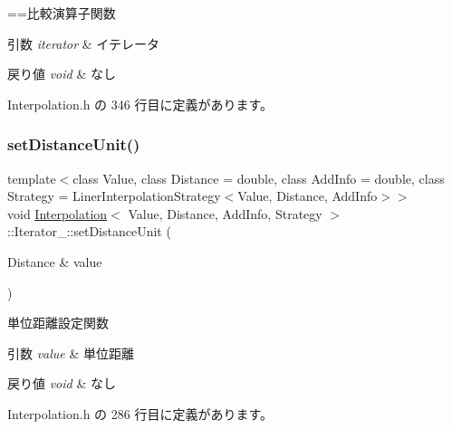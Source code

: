 ==比較演算子関数 


\begin{DoxyParams}{引数}
{\em iterator} & イテレータ \\
\hline
\end{DoxyParams}

\begin{DoxyRetVals}{戻り値}
{\em void} & なし \\
\hline
\end{DoxyRetVals}


 Interpolation.\+h の 346 行目に定義があります。

\mbox{\label{class_interpolation_1_1_iterator___a6186c74f7276b8fbb521b133390fdcbf}} 
\subsubsection{\texorpdfstring{set\+Distance\+Unit()}{setDistanceUnit()}}
{\footnotesize\ttfamily template$<$class Value, class Distance = double, class Add\+Info = double, class Strategy = Liner\+Interpolation\+Strategy$<$\+Value, Distance, Add\+Info$>$$>$ \\
void \mbox{\hyperlink{class_interpolation}{Interpolation}}$<$ Value, Distance, Add\+Info, Strategy $>$\+::Iterator\+\_\+\+::set\+Distance\+Unit (\begin{DoxyParamCaption}\item[{Distance \&}]{value }\end{DoxyParamCaption})\hspace{0.3cm}{\ttfamily [inline]}}



単位距離設定関数 


\begin{DoxyParams}{引数}
{\em value} & 単位距離 \\
\hline
\end{DoxyParams}

\begin{DoxyRetVals}{戻り値}
{\em void} & なし \\
\hline
\end{DoxyRetVals}


 Interpolation.\+h の 286 行目に定義があります。

